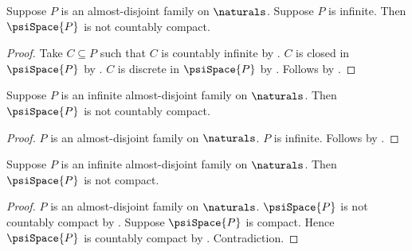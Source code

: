 \begin{theorem}\label{infinite_psi_space_is_not_countably_compact}
    Suppose $P$ is an almost-disjoint family on $\naturals$.
    Suppose $P$ is infinite.
    Then $\psiSpace{P}$ is not countably compact.
\end{theorem}
\begin{proof}
    Take $C\subseteq P$ such that $C$ is countably infinite
        by .
    $C$ is closed in $\psiSpace{P}$ by .
    $C$ is discrete in $\psiSpace{P}$
        by .
    Follows by
        .
\end{proof}

\begin{corollary}\label{infinite_almost_disjoint_psi_space_is_not_countably_compact}
    Suppose $P$ is an infinite almost-disjoint family on $\naturals$.
    Then $\psiSpace{P}$ is not countably compact.
\end{corollary}
\begin{proof}
    $P$ is an almost-disjoint family on $\naturals$.
    $P$ is infinite.
    Follows by .
\end{proof}

\begin{corollary}\label{infinite_almost_disjoint_psi_space_is_not_compact}
    Suppose $P$ is an infinite almost-disjoint family on $\naturals$.
    Then $\psiSpace{P}$ is not compact.
\end{corollary}
\begin{proof}
    $P$ is an almost-disjoint family on $\naturals$.
    $\psiSpace{P}$ is not countably compact by
        .
    Suppose $\psiSpace{P}$ is compact.
    Hence $\psiSpace{P}$ is countably compact by
        .
    Contradiction.
\end{proof}

